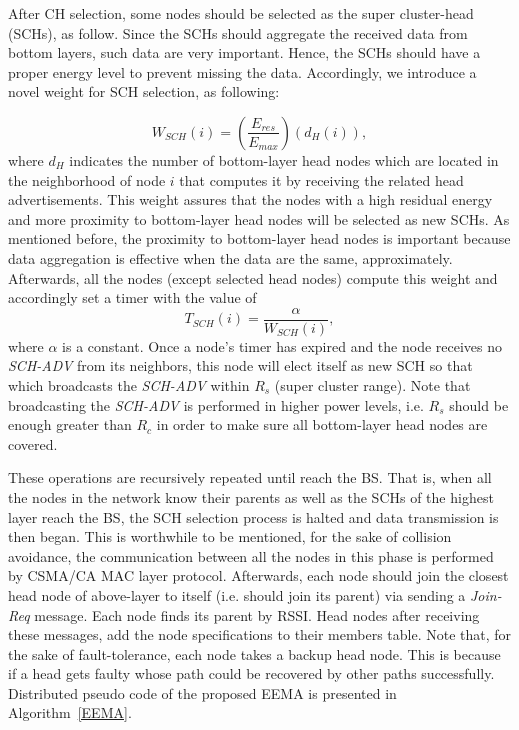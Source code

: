 \documentclass[journal]{IEEEtran}
\begin{document}
After CH selection, some nodes should be selected as the super cluster-head (SCHs), as follow. Since the SCHs should aggregate the received data from bottom layers, such data are very important. Hence, the SCHs should have a proper energy level to prevent missing the data. Accordingly, we introduce a novel weight for SCH selection, as following:   

\begin{equation}
W_{SCH}(i)=(\frac{E_{res}}{E_{max}})(d_{H}(i)),
\label{eq:SCH}
\end{equation}
where $d_{H}$ indicates the number of bottom-layer head nodes which are located in the neighborhood of node $i$ that computes it by receiving the related head advertisements.  This weight assures that the nodes with a high residual energy and more proximity to bottom-layer head nodes will be selected as new SCHs. As mentioned before, the proximity to bottom-layer head nodes is important because data aggregation is effective when the data are the same, approximately. 
 Afterwards, all the nodes (except selected head nodes) compute this weight and accordingly set a timer with the value of
\begin{equation}
\label{eq-SCHT}
T_{SCH}(i)=\frac{\alpha}{W_{SCH}(i)},
\end{equation}
where $\alpha$ is a constant. Once a node's timer has expired and the node receives no {\it SCH-ADV} from its neighbors,  this node will elect itself as new SCH so that which broadcasts the {\it SCH-ADV} within $R_{s}$ (super cluster range). Note that broadcasting the {\it SCH-ADV} is performed in higher power levels, i.e. $R_{s}$ should be enough greater than $R_{c}$ in order to make sure all bottom-layer head nodes are covered.

These operations are recursively repeated until reach the BS. That is, when all the nodes in the network know their parents as well as the SCHs of the highest layer reach the BS, the SCH selection process is halted and data transmission is then began.  This is worthwhile to be mentioned, for the sake of collision avoidance, the communication between all the nodes in this phase is performed by CSMA/CA MAC layer protocol.  Afterwards, each node should join the closest head node of above-layer to itself (i.e. should join its parent) via sending a {\it Join-Req} message.  Each node finds its parent by RSSI. Head nodes after receiving these messages, add the node specifications to their members table. Note that, for the sake of fault-tolerance, each node takes a backup head node. This is because if a head gets faulty whose path could be recovered by other paths successfully. Distributed pseudo code of the proposed EEMA is presented in Algorithm~\ref{EEMA}.
\end{document}
